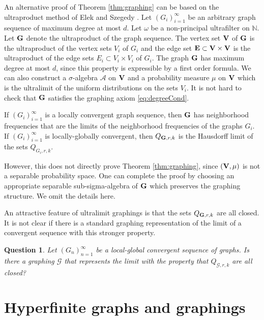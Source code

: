 \documentclass{article}
\newtheorem{question}[theorem]{Question}
\def\AA{\mathcal{A}}\def\BB{\mathcal{B}}\def\CC{\mathcal{C}}
\def\GG{\mathcal{G}}\def\HH{\mathcal{H}}\def\II{\mathcal{I}}
\def\bV {{\bf V}}
\def\bE {{\bf E}}
\def\bG {{\bf G}}
\begin{document}
{An alternative proof of Theorem \ref{thm:graphing} can be based on
the ultraproduct method of Elek and Szegedy \cite{ESz}.} Let
$(G_i)_{i=1}^\infty$ be an arbitrary graph sequence of maximum degree
at most $d$. Let $\omega$ be a non-principal ultrafilter on
$\mathbb{N}$. Let $\bG$ denote the ultraproduct of the graph
sequence. The vertex set $\bV$ of $\bG$ is the ultraproduct of the
vertex sets $V_i$ of $G_i$ and the edge set $\bE\subset \bV\times\bV$
is the {ultraproduct} of the edge sets $E_i\subset V_i\times V_i$ of
$G_i$. The graph $\bG$ has maximum degree at most $d$, since this
property is expressible by a first order formula. We can also
construct a $\sigma$-algebra $\AA$ on $\bV$ and a probability measure
$\mu$ on $\bV$ which is the ultralimit of the uniform distributions
on the sets $V_i$. It is not hard to check that $\bG$ satisfies the
graphing axiom \eqref{eq:degreeCond}.

If $(G_i)_{i=1}^\infty$ is a locally convergent graph sequence,
then $\bG$ has neighborhood frequencies that are the limits of the
neighborhood frequencies of the graphs $G_i$. If
$(G_i)_{i=1}^\infty$ is locally-globally convergent, then
$Q_{\bG,r,k}$ is the Hausdorff limit of the sets $Q_{G_i,r,k}$.

However, this does not directly prove Theorem \ref{thm:graphing},
since $(\bV,\mu)$ is not a separable probability space. One can
complete the proof by choosing an appropriate separable
sub-sigma-algebra of $\bG$ which preserves the graphing structure. We
omit the details here.

An attractive feature of ultralimit graphings is that the sets
$Q_{\bG,r,k}$ are all closed. It is not clear if there is a standard
graphing representation of the limit of a convergent sequence with
this stronger property.

\begin{question}
\label{ques:closedness}
 Let $(G_n)_{n=1}^\infty$ be a local-global convergent sequence of graphs. Is
there a graphing $\GG$ that represents the limit with the property
that $Q_{\GG,r,k}$ are all closed?
\end{question}



\section{Hyperfinite graphs and graphings}
\end{document}
